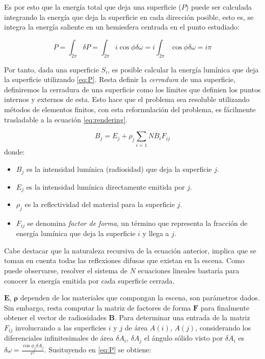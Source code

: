 Es por esto que la energía total que deja una superficie ($P$) puede ser calculada integrando la energía que deja la superficie en cada dirección posible,
esto es, se integra la energía saliente en un hemiesfera centrada en el punto estudiado:

\begin{equation}
    P = \int_{2\pi} \delta{P} = \int_{2\pi} i\cos{\phi}\delta{\omega} = i \int_{2\pi} \cos{\phi}\delta{\omega} = i\pi \label{eq:P}
\end{equation}

Por tanto, dada una superficie $S_{i}$, es posible calcular la energía lumínica que deja la superficie utilizando \eqref{eq:P}.
Resta definir la \textit{cerradura} de una superficie, definiremos la cerradura de una superficie como los límites que definien
los puntos internos y externos de esta. Esto hace que el problema sea resoluble utilizando métodos de elementos finitos, con esta reformulación 
del problema, es fácilmente trasladable a la ecuación \eqref{eq:rendering}.

\begin{equation}
    B_{j} = E_{j} + \rho_{j} \sum_{i=1}{N} B_{i} F_{ij} \label{eq:radiosity}
\end{equation}
donde:
\begin{itemize}
    \item $B_{j}$ es la intensidad lumínica (radiosidad) que deja la superficie $j$.
    \item $E_{j}$ es la intensidad lumínica directamente emitida por $j$.
    \item $\rho_{j}$ es la reflectividad del material para la superficie $j$.
    \item $F_{ij}$ se denomina \textit{factor de forma}, un término que representa la fracción de energía lumínica
    que deja la superficie $i$ y llega a $j$. 
\end{itemize}

Cabe destacar que la naturaleza recursiva de la ecuación anterior, implica que se toman en cuenta todas las reflexiones 
difusas que existan en la escena. Como puede observarse, resolver el sistema de $N$ ecuaciones lineales 
bastaría para conocer la energía emitida por cada superficie cerrada. 

$\mathbf{E}$, $\mathbf{\rho}$ dependen de los materiales que compongan la escena, son parámetros dados. Sin embargo, 
resta computar la matriz de factores de forma $\textbf{F}$ para finalmente obtener el vector de radiosidades $\textbf{B}$. 
Para determinar una entrada de la matriz $F_{ij}$ involucrando a las superficies $i$ y $j$ de área $A(i)$, $A(j)$,
considerando los diferenciales infinitesimales de área $\delta{A_{i}}$, $\delta{A_{j}}$ el ángulo sólido visto por
$\delta{A_{i}}$ es $\delta{\omega} = \frac{\cos{\phi_{j}\delta{A_{j}}}}{r^{2}}$. Susituyendo en \eqref{eq:P} se obtiene:


